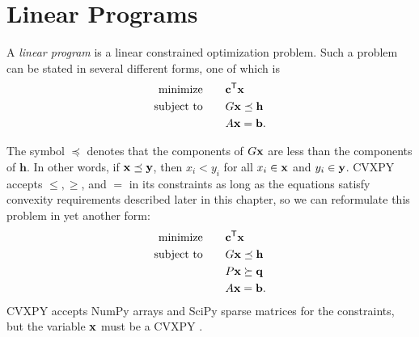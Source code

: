 \labdependencies{}

\section*{Linear Programs} %

A \emph{linear program} is a linear constrained optimization problem. Such a problem can be stated in several
different forms, one of which is
\begin{align*}
\text{minimize}\qquad &\mathbf{c}^{\mathsf T} \mathbf{x} \\
\text{subject to}\qquad &G\mathbf{x} \preceq \mathbf{h}\\
&A\mathbf{x} = \mathbf{b}.
\end{align*}

The symbol $\preceq$ denotes that the components of $G\mathbf{x}$ are less than the components of $\mathbf{h}$.
In other words, if $\mathbf{x}\preceq\mathbf{y}$, then $x_i < y_i$ for all $x_i\in\mathbf{x}$ and $y_i\in\mathbf{y}$. 
CVXPY accepts  $\leq, \geq$, and $=$ in its constraints as long as the equations satisfy convexity requirements described later in this chapter, so we can reformulate this problem in yet another form:
\begin{align*}
\text{minimize}\qquad &\mathbf{c}^{\mathsf T} \mathbf{x} \\
\text{subject to}\qquad &G\mathbf{x} \preceq \mathbf{h}\\
&P\mathbf{x} \succeq \mathbf{q}\\
&A\mathbf{x} = \mathbf{b}.
\end{align*}
CVXPY accepts NumPy arrays and SciPy sparse matrices for the constraints, but the variable $\mathbf{x}$ must be a CVXPY .

\begin{comment}
The corresponding \emph{dual program} for the above linear program has the form
\begin{align*}
\text{maximize}\qquad &-h\trp z - b\trp y \\
\text{subject to}\qquad &G\trp z + A\trp y + c = 0\\
 &z \geq 0.
\end{align*}
CVXOPT provides functions to solve both the original (\emph{primal}) linear program and its dual program.
\end{comment}

